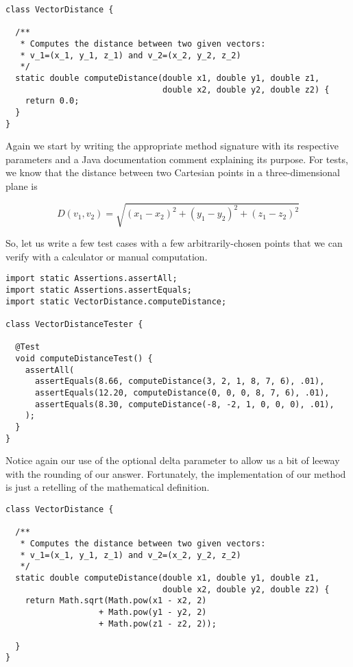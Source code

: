 \begin{cl}{}
\begin{lstlisting}[language=MyJava]
class VectorDistance {

  /**
   * Computes the distance between two given vectors:
   * v_1=(x_1, y_1, z_1) and v_2=(x_2, y_2, z_2)
   */
  static double computeDistance(double x1, double y1, double z1, 
                                double x2, double y2, double z2) {
    return 0.0;
  }
}
\end{lstlisting}
\end{cl}

Again we start by writing the appropriate method signature with its respective parameters and a Java documentation comment explaining its purpose. For tests, we know that the distance between two Cartesian points in a three-dimensional plane is 

\[
D(v_1, v_2) = \sqrt{(x_1 - x_2)^2 + (y_1 - y_2)^2 + (z_1 - z_2)^2}
\]

So, let us write a few test cases with a few arbitrarily-chosen points that we can verify with a calculator or manual computation.

\begin{cl}{}
\begin{lstlisting}[language=MyJava]
import static Assertions.assertAll;
import static Assertions.assertEquals;
import static VectorDistance.computeDistance;

class VectorDistanceTester {

  @Test
  void computeDistanceTest() {
    assertAll(
      assertEquals(8.66, computeDistance(3, 2, 1, 8, 7, 6), .01),
      assertEquals(12.20, computeDistance(0, 0, 0, 8, 7, 6), .01),
      assertEquals(8.30, computeDistance(-8, -2, 1, 0, 0, 0), .01),
    );
  }
}
\end{lstlisting}
\end{cl}
Notice again our use of the optional delta parameter to allow us a bit of leeway with the rounding of our answer. Fortunately, the implementation of our method is just a retelling of the mathematical definition.

\begin{cl}{}
\begin{lstlisting}[language=MyJava]
class VectorDistance {

  /**
   * Computes the distance between two given vectors:
   * v_1=(x_1, y_1, z_1) and v_2=(x_2, y_2, z_2)
   */
  static double computeDistance(double x1, double y1, double z1, 
                                double x2, double y2, double z2) {
    return Math.sqrt(Math.pow(x1 - x2, 2) 
                   + Math.pow(y1 - y2, 2)
                   + Math.pow(z1 - z2, 2));
  
  }
}
\end{lstlisting}
\end{cl}

